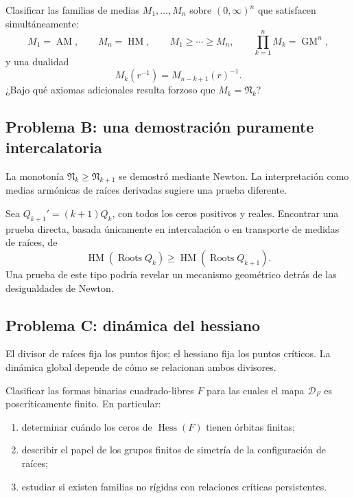 \documentclass[11pt,oneside]{scrartcl}
\theoremstyle{plainblue}
\theoremstyle{definitionblue}
\theoremstyle{remarkgray}
\newcommand{\Hess}{\operatorname{Hess}}
\newcommand{\AM}{\operatorname{AM}}
\newcommand{\GM}{\operatorname{GM}}
\newcommand{\HM}{\operatorname{HM}}
\newcommand{\cN}{\mathfrak{N}}
\newcommand{\cD}{\mathcal{D}}
\begin{document}
\begin{researchbox}[Problema A]
Clasificar las familias de medias
\(M_1,\dots,M_n\) sobre \((0,\infty)^n\) que satisfacen simultáneamente:
\[
M_1=\AM,
\qquad M_n=\HM,
\qquad M_1\ge\cdots\ge M_n,
\qquad \prod_{k=1}^{n}M_k=\GM^n,
\]
y una dualidad
\[
M_k(r^{-1})=M_{n-k+1}(r)^{-1}.
\]
¿Bajo qué axiomas adicionales resulta forzoso que \(M_k=\cN_k\)?
\end{researchbox}

\subsection{Problema B: una demostración puramente intercalatoria}

La monotonía \(\cN_k\ge\cN_{k+1}\) se demostró mediante Newton. La interpretación
como medias armónicas de raíces derivadas sugiere una prueba diferente.

\begin{researchbox}[Problema B]
Sea \(Q_{k+1}'=(k+1)Q_k\), con todos los ceros positivos y reales. Encontrar una
prueba directa, basada únicamente en intercalación o en transporte de medidas de
raíces, de
\[
\HM(\operatorname{Roots}Q_k)
\ge
\HM(\operatorname{Roots}Q_{k+1}).
\]
Una prueba de este tipo podría revelar un mecanismo geométrico detrás de las
desigualdades de Newton.
\end{researchbox}

\subsection{Problema C: dinámica del hessiano}

El divisor de raíces fija los puntos fijos; el hessiano fija los puntos críticos. La
dinámica global depende de cómo se relacionan ambos divisores.

\begin{researchbox}[Problema C]
Clasificar las formas binarias cuadrado-libres \(F\) para las cuales el mapa
\(\cD_F\) es poscríticamente finito. En particular:
\begin{enumerate}[leftmargin=8mm]
\item determinar cuándo los ceros de \(\Hess(F)\) tienen órbitas finitas;
\item describir el papel de los grupos finitos de simetría de la configuración de
raíces;
\item estudiar si existen familias no rígidas con relaciones críticas persistentes.
\end{enumerate}
\end{researchbox}
\end{document}
